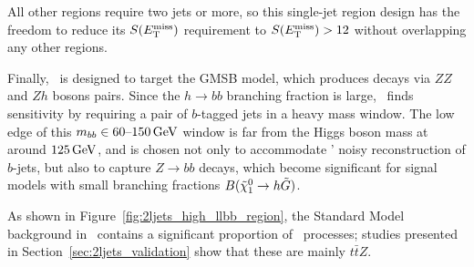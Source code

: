 All other regions require two jets or more, so this single-jet region design
has the freedom to reduce its $\metsig$ requirement to $\metsig > 12$
without overlapping any other regions.

Finally, \srllbb\ is designed to target the GMSB model, which produces decays
via $ZZ$ and $Zh$ bosons pairs.
Since the $h\to bb$ branching fraction is large, \srllbb\ finds
sensitivity by requiring a pair of $b$-tagged jets in a heavy mass window.
The low edge of this $\mbb \in 60\textrm{--}150\,\eV[G]$ window is far from the
Higgs boson mass at around $125\,\eV[G]$, and is chosen not only to
accommodate \atlas' noisy reconstruction of $b$-jets, but also to
capture $Z\to bb$ decays, which become significant for signal models
with small branching fractions $B(\neutralino_1 \to h \gravitino)$.

As shown in Figure~\ref{fig:2ljets_high_llbb_region}, the Standard Model
background in \srllbb\ contains a significant proportion of \topother\
processes; studies presented in Section~\ref{sec:2ljets_validation} show that
these are mainly $t\bar t Z$.

